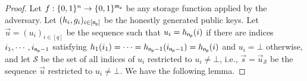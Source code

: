 \begin{proof}
%

Let $f:\{0, 1\}^n\rightarrow\{0, 1\}^{\mathsf{m_a}}$ be any storage function applied by the adversary. Let $(h_i,g_i)_{i\in[\mathsf{n_p}]}$ be the honestly generated public keys.
Let $\vec u=(u_i)_{i\in[q]}$ be the sequence such that $u_i= h_{\mathsf{n_p}}(i)$ if there are indices $i_1,\cdots,i_{\mathsf{n_p}-1}$ satisfying
$ h_1(i_1)=\cdots= h_{\mathsf{n_p}-1}(i_{\mathsf{n_p}-1})= h_{\mathsf{n_p}}(i)$ and $ u_i=\bot$ otherwise, and let $\mathcal S$ be the set of all indices of $u_i$ restricted to $u_i\neq \bot$, i.e., $\vec s=\vec u_{\mathcal S}$ be the sequence $\vec u$ restricted to $u_i\neq \bot$.
We have the following lemma.


\end{proof}
